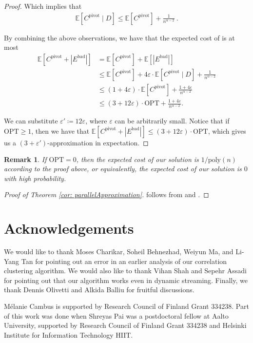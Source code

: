 \documentclass[10pt,a4paper]{article}
\newtheorem{remark}{Remark}[section]
\newcommand{\poly}{\mathrm{poly}}
\newcommand{\eps}{\ensuremath{\varepsilon}}
\newcommand{\ourcluster}{\ensuremath{C^{\textrm{pivot}}}\xspace}
\newcommand{\opt}{\textrm{OPT}\xspace}
\newcommand{\badedges}{\ensuremath{E^{\textrm{bad}}}\xspace}
\begin{document}
\begin{proof}
 Which implies that 
 \begin{align*}
     \mathbb{E}\left[\ourcluster\mid D \right] \leq \mathbb{E}\left[\ourcluster\right] + \frac{1}{n^{\alpha-2}}\ .
 \end{align*}

By combining the above observations, we have that the expected cost of  is at most
\begin{align*}
    \mathbb{E}\left[\ourcluster  + |\badedges|\right] &= \mathbb{E}\left[\ourcluster\right]  + \mathbb{E}\left[|\badedges|\right]\\
    &\leq \mathbb{E}\left[\ourcluster\right] + 4\eps\cdot \mathbb{E}[\ourcluster\mid D] + \frac{1}{n^{\alpha-2}}\\
    &\leq (1 + 4\eps)\cdot \mathbb{E}\left[\ourcluster\right] + \frac{1+4\eps}{n^{\alpha-2}}\\
    &\leq (3+12\eps) \cdot \opt + \frac{1+4\eps}{n^{\alpha-2}}.
\end{align*}


We can substitute $\eps' \coloneqq 12\eps$, where $\eps$ can be arbitrarily small. 
Notice that if $\opt \geq 1$, then we have that $\mathbb{E}\left[\ourcluster  + |\badedges|\right]\leq (3+12\eps) \cdot \opt$, which gives us a $(3+\eps')$-approximation in expectation. \qedhere


\end{proof}

\begin{remark}
    If $\opt = 0$, then the expected cost of our solution is $1/\poly(n)$ according to the proof above, or equivalently, the expected cost of our solution is $0$ with high probability.
\end{remark}

\begin{proof}[Proof of Theorem \ref{cor: parallelApproximation}]
     follows from  and .
\end{proof}

\section*{Acknowledgements}
We would like to thank Moses Charikar, Soheil Behnezhad, Weiyun Ma, and Li-Yang Tan for pointing out an error in an earlier analysis of our correlation clustering algorithm.
We would also like to thank Vihan Shah and Sepehr Assadi for pointing out that our algorithm works even in dynamic streaming. Finally, we thank Dennis Olivetti and Alkida Balliu for fruitful discussions.

M\'elanie Cambus is supported by Research Council of Finland Grant 334238. Part of this work was done when Shreyas Pai was a postdoctoral fellow at Aalto University, supported by Research Council of Finland Grant 334238 and Helsinki Institute for Information Technology HIIT.








\end{document}
